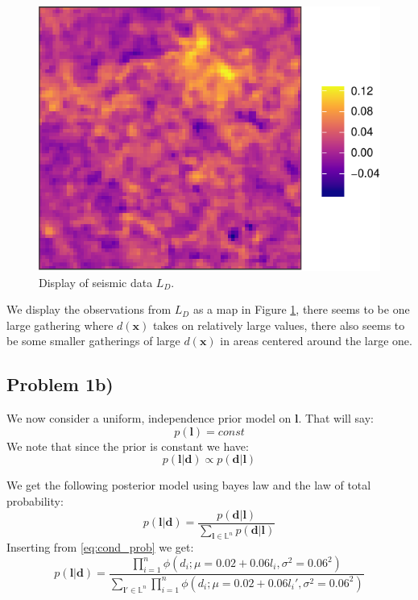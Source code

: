 \documentclass[]{article}
\newcommand{\vect}[1]{\ensuremath{\boldsymbol{\mathbf{#1}}}}
\begin{document}
\begin{figure}
\centering
\includegraphics{Exercise-3_files/figure-latex/fig1a1-1.pdf}
\caption{\label{fig:1a1} Display of seismic data \(L_D\).}
\end{figure}

We display the observations from \(L_D\) as a map in Figure
\ref{fig:1a1}, there seems to be one large gathering where
\(d(\vect x)\) takes on relatively large values, there also seems to be
some smaller gatherings of large \(d(\vect x)\) in areas centered around
the large one.

\subsection*{Problem 1b)}

We now consider a uniform, independence prior model on \(\vect l\). That
will say: \begin{equation}
p(\vect l) = const
\end{equation} We note that since the prior is constant we have:
\begin{equation}
p(\vect l | \vect d) \propto p(\vect d | \vect l)
\end{equation}

We get the following posterior model using bayes law and the law of
total probability: \begin{equation}
p(\vect l | \vect d) = \dfrac{p(\vect d | \vect l)}{\sum_{\vect l \in \mathbb{L}^n}p(\vect d | \vect l)}
\end{equation} Inserting from \eqref{eq:cond_prob} we get:
\begin{equation}
p(\vect l | \vect d) = \dfrac{ \prod_{i=1}^{n}  \phi(d_i  ; \mu = 0.02 + 0.06l_i, \sigma^2 = 0.06^2)}{\sum_{\vect l' \in \mathbb{L}^n} \prod_{i=1}^{n}  \phi(d_i  ; \mu = 0.02 + 0.06l_i', \sigma^2 = 0.06^2)}
\end{equation}
\end{document}
